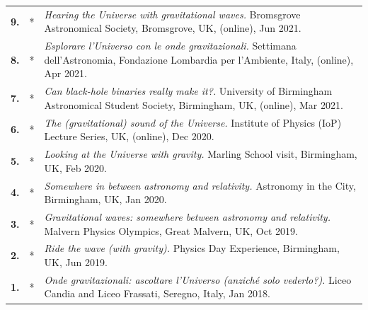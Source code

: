 {\begin{longtable}{rp{0.3cm}p{15.8cm}}
%
\textbf{9.} & * & \textit{Hearing the Universe with gravitational waves.}
\newline{}
Bromsgrove Astronomical Society, Bromsgrove, UK, (online), Jun 2021.
\vspace{0.05cm}\\
%
\textbf{8.} & * & \textit{Esplorare l'Universo con le onde gravitazionali.}
\newline{}
Settimana dell'Astronomia, Fondazione Lombardia per l'Ambiente, Italy, (online), Apr 2021.
\vspace{0.05cm}\\
%
\textbf{7.} & * & \textit{Can black-hole binaries really make it?.}
\newline{}
University of Birmingham Astronomical Student Society, Birmingham, UK, (online), Mar 2021.
\vspace{0.05cm}\\
%
\textbf{6.} & * & \textit{The (gravitational) sound of the Universe.}
\newline{}
Institute of Physics (IoP) Lecture Series, UK, (online), Dec 2020.
\vspace{0.05cm}\\
%
\textbf{5.} & * & \textit{Looking at the Universe with gravity.}
\newline{}
Marling School visit, Birmingham, UK, Feb 2020.
\vspace{0.05cm}\\
%
\textbf{4.} & * & \textit{Somewhere in between astronomy and relativity.}
\newline{}
Astronomy in the City, Birmingham, UK, Jan 2020.
\vspace{0.05cm}\\
%
\textbf{3.} & * & \textit{Gravitational waves: somewhere between astronomy and relativity.}
\newline{}
Malvern Physics Olympics, Great Malvern, UK, Oct 2019.
\vspace{0.05cm}\\
%
\textbf{2.} & * & \textit{Ride the wave (with gravity).}
\newline{}
Physics Day Experience, Birmingham, UK, Jun 2019.
\vspace{0.05cm}\\
%
\textbf{1.} & * & \textit{Onde gravitazionali: ascoltare l'Universo (anzich\'e solo vederlo?).}
\newline{}
Liceo Candia and Liceo Frassati, Seregno, Italy, Jan 2018.
\vspace{0.05cm}\\
%
\end{longtable} }